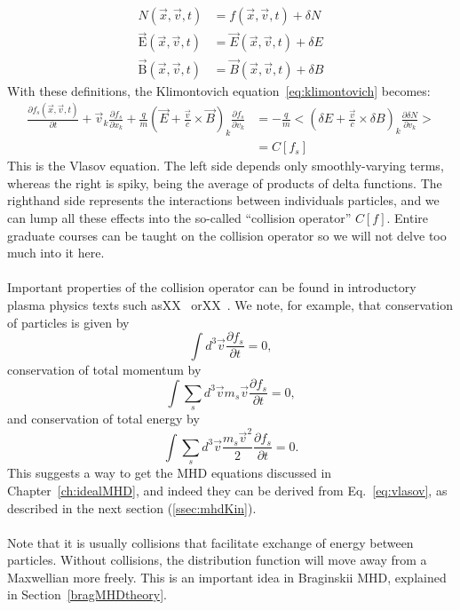 \begin{align*}
  N(\vec x,\vec v,t)&=f(\vec x,\vec v,t)+\delta N\\
  \mathrm{\vec E}(\vec x,\vec v,t)&=\vec E(\vec x,\vec v,t)+\delta E\\
  \mathrm{\vec B}(\vec x,\vec v,t)&=\vec B(\vec x,\vec v,t)+\delta B
\end{align*}
With these definitions, the Klimontovich equation~\ref{eq:klimontovich} becomes:
\begin{align}
  \frac{\partial f_s(\vec x,\vec v,t)}{\partial t}+\vec v_k\frac{\partial f_s}{\partial x_k}+\frac qm (\vec E+\frac{\vec v}{c}\times\vec B)_k\frac{\partial f_s}{\partial v_k}&=-\frac qm<(\delta E+\frac{\vec v}{c}\times\delta B)_k\frac{\partial \delta N}{\partial v_k}>\nonumber\\
  &=C[f_s] \label{eq:vlasov}
\end{align}
This is the Vlasov equation. The left side depends only smoothly-varying terms, whereas the right is spiky, being the average of products of delta functions. The righthand side represents the interactions between individuals particles, and we can lump all these effects into the so-called ``collision operator'' $C[f]$. Entire graduate courses can be taught on the collision operator so we will not delve too much into it here.\\
\\
Important properties of the collision operator can be found in introductory plasma physics texts such asXX~\cite{Nicholson} orXX~\cite{KunzLecture1}. We note, for example, that conservation of particles is given by
\begin{equation}
  \int d^3\vec v\frac{\partial f_s}{\partial t}=0,
\end{equation}
conservation of total momentum by
\begin{equation}
  \int\sum_sd^3\vec vm_s\vec v\frac{\partial f_s}{\partial t}=0,
\end{equation} and conservation of total energy by
\begin{equation}
  \int\sum_s d^3\vec v\frac{m_s\vec v^2}2 \frac{\partial f_s}{\partial t}=0.
\end{equation}
This suggests a way to get the MHD equations discussed in Chapter~\ref{ch:idealMHD}, and indeed they can be derived from Eq.~\ref{eq:vlasov}, as described in the next section (\ref{ssec:mhdKin}). \\
\\


Note that it is usually collisions that facilitate exchange of energy between particles. Without collisions, the distribution function will move away from a Maxwellian more freely. This is an important idea in Braginskii MHD, explained in Section~\ref{bragMHDtheory}.
   
